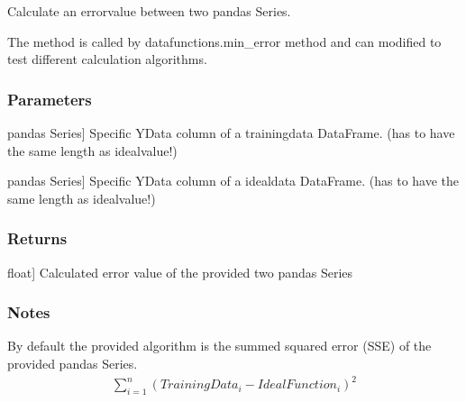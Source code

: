 \documentclass[letterpaper,10pt,english]{sphinxmanual}
\begin{document}
\begin{fulllineitems}
\label{\detokenize{_autosummary/functionfinder.config.error_calculation:functionfinder.config.error_calculation}}
\pysigstartsignatures
{}
\pysigstopsignatures
\sphinxAtStartPar
Calculate an error\sphinxhyphen{}value between two pandas Series.

\sphinxAtStartPar
The method is called by datafunctions.min\_error method
and can modified to test different calculation algorithms.


\subsubsection{Parameters}
\label{\detokenize{_autosummary/functionfinder.config.error_calculation:parameters}}\begin{description}
\sphinxlineitem{trainvalue}{[}pandas Series{]}
\sphinxAtStartPar
Specific Y\sphinxhyphen{}Data column of a trainingdata DataFrame.
(has to have the same length as idealvalue!)

\sphinxlineitem{idealvalue}{[}pandas Series{]}
\sphinxAtStartPar
Specific Y\sphinxhyphen{}Data column of a idealdata DataFrame.
(has to have the same length as idealvalue!)

\end{description}


\subsubsection{Returns}
\label{\detokenize{_autosummary/functionfinder.config.error_calculation:returns}}\begin{description}
\sphinxlineitem{calcerror}{[}float{]}
\sphinxAtStartPar
Calculated error value of the provided two pandas Series

\end{description}


\subsubsection{Notes}
\label{\detokenize{_autosummary/functionfinder.config.error_calculation:notes}}
\sphinxAtStartPar
By default the provided algorithm is the summed squared error (SSE)
of the provided pandas Series.
\begin{equation*}
\begin{split}\sum_{i=1}^{n}(TrainingData_{i} - IdealFunction_{i})^2\end{split}
\end{equation*}
\end{fulllineitems}
\end{document}
